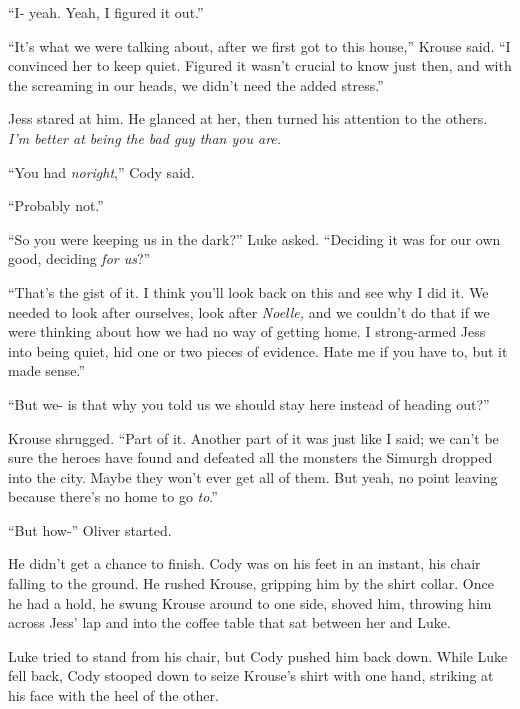 ``I- yeah.  Yeah, I figured it out.''



``It's what we were talking about, after we first got to this house,'' Krouse said.  ``I convinced her to keep quiet.  Figured it wasn't crucial to know just then, and with the screaming in our heads, we didn't need the added stress.''



Jess stared at him.  He glanced at her, then turned his attention to the others.  \emph{I'm better at being the bad guy than you are.}



``You had \emph{no}\emph{right},'' Cody said.



``Probably not.''



``So you were keeping us in the dark?'' Luke asked.  ``Deciding it was for our own good, deciding \emph{for us}?''



``That's the gist of it.  I think you'll look back on this and see why I did it.  We needed to look after ourselves, look after \emph{Noelle, }and we couldn't do that if we were thinking about how we had no way of getting home.  I strong-armed Jess into being quiet, hid one or two pieces of evidence.  Hate me if you have to, but it made sense.''



``But we- is that why you told us we should stay here instead of heading out?''



Krouse shrugged. ``Part of it.  Another part of it was just like I said; we can't be sure the heroes have found and defeated all the monsters the Simurgh dropped into the city.  Maybe they won't ever get all of them.  But yeah, no point leaving because there's no home to go \emph{to}.''



``But how-'' Oliver started.



He didn't get a chance to finish.  Cody was on his feet in an instant, his chair falling to the ground.  He rushed Krouse, gripping him by the shirt collar.  Once he had a hold, he swung Krouse around to one side, shoved him, throwing him across Jess' lap and into the coffee table that sat between her and Luke.



Luke tried to stand from his chair, but Cody pushed him back down.  While Luke fell back, Cody stooped down to seize Krouse's shirt with one hand, striking at his face with the heel of the other.



